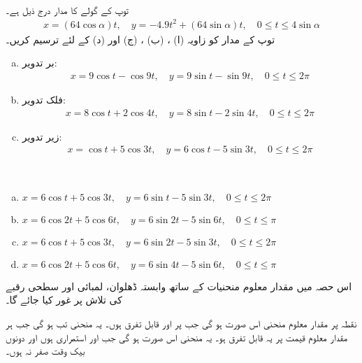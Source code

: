 \\
توپ کے  گولے کا مدار درج ذیل ہے۔
\begin{align*}
x=(64\cos \alpha)t,\quad y=-4.9t^2+(64\sin\alpha)t,\quad 0\le t\le 4\sin \alpha
\end{align*}
توپ کے مدار کو زاویہ (ا) ، (ب) ، (ج)  اور (د)   کے لئے ترسیم کریں۔
\\
\begin{enumerate}[a.]
\item
بر تدویر:
\begin{align*}
x=9\cos t-\cos 9t,\quad y=9\sin t-\sin 9t,\quad 0\le t\le 2\pi
\end{align*}
\item
فلک تدویر:
\begin{align*}
x=8\cos t+2\cos 4t,\quad y=8\sin t-2\sin 4t,\quad 0\le t\le 2\pi
\end{align*}
\item
زیر تدویر:
\begin{align*}
x=\cos t+5\cos 3t,\quad y=6\cos t-5\sin 3t,\quad 0\le t\le 2\pi
\end{align*}
\end{enumerate}
\\
\begin{enumerate}[a.]
\item
$x=6\cos t+5\cos 3t,\quad y=6\sin t-5\sin 3t,\quad 0\le t\le 2\pi$
\item
$x=6\cos 2t+5\cos 6t,\quad y=6\sin 2t-5\sin 6t,\quad 0\le t\le \pi$
\item
$x=6\cos t+5\cos 3t,\quad y=6\sin 2t-5\sin 3t,\quad 0\le t\le 2\pi$
\item
$x=6\cos 2t+5\cos 6t,\quad y=6\sin 4t-5\sin 6t,\quad 0\le t\le \pi$
\end{enumerate}

اس حصہ میں مقدار معلوم منحنیات کے ساتھ وابستہ ڈھلوان، لمبائی اور سطحی رقبے کی تلاش پر غور کیا جائے گا۔

نقطہ  پر مقدار معلوم منحنی   اس صورت  ہو گی جب  پر  اور  قابل تفرق ہوں۔ یہ منحنی تب  ہو گی جب ہر مقدار معلوم قیمت پر یہ قابل تفرق ہو۔ یہ منحنی اس صورت  ہو گی جب  اور  استمراری ہوں اور دونوں بیک وقت صفر نہ ہوں۔

